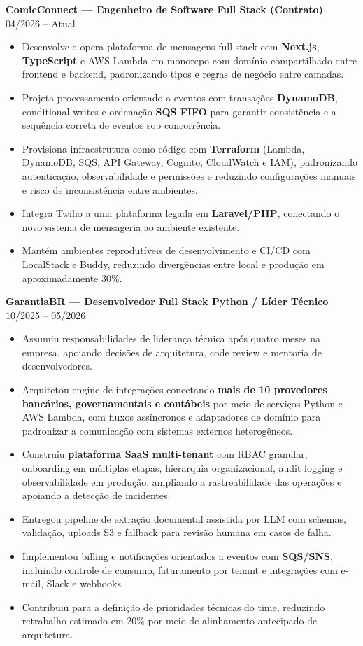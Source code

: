 \documentclass[a4paper,10pt]{article}
\begin{document}
\textbf{ComicConnect — Engenheiro de Software Full Stack (Contrato)} \hfill 04/2026 -- Atual
\begin{itemize}[leftmargin=*, itemsep=1pt]
    \item Desenvolve e opera plataforma de mensagens full stack com \textbf{Next.js}, \textbf{TypeScript} e AWS Lambda em monorepo com domínio compartilhado entre frontend e backend, padronizando tipos e regras de negócio entre camadas.
    \item Projeta processamento orientado a eventos com transações \textbf{DynamoDB}, conditional writes e ordenação \textbf{SQS FIFO} para garantir consistência e a sequência correta de eventos sob concorrência.
    \item Provisiona infraestrutura como código com \textbf{Terraform} (Lambda, DynamoDB, SQS, API Gateway, Cognito, CloudWatch e IAM), padronizando autenticação, observabilidade e permissões e reduzindo configurações manuais e risco de inconsistência entre ambientes.
    \item Integra Twilio a uma plataforma legada em \textbf{Laravel/PHP}, conectando o novo sistema de mensageria ao ambiente existente.
    \item Mantém ambientes reprodutíveis de desenvolvimento e CI/CD com LocalStack e Buddy, reduzindo divergências entre local e produção em aproximadamente 30\%.
\end{itemize}

\textbf{GarantiaBR — Desenvolvedor Full Stack Python / Líder Técnico} \hfill 10/2025 -- 05/2026
\begin{itemize}[leftmargin=*, itemsep=1pt]
    \item Assumiu responsabilidades de liderança técnica após quatro meses na empresa, apoiando decisões de arquitetura, code review e mentoria de desenvolvedores.
    \item Arquitetou engine de integrações conectando \textbf{mais de 10 provedores bancários, governamentais e contábeis} por meio de serviços Python e AWS Lambda, com fluxos assíncronos e adaptadores de domínio para padronizar a comunicação com sistemas externos heterogêneos.
    \item Construiu \textbf{plataforma SaaS multi-tenant} com RBAC granular, onboarding em múltiplas etapas, hierarquia organizacional, audit logging e observabilidade em produção, ampliando a rastreabilidade das operações e apoiando a detecção de incidentes.
    \item Entregou pipeline de extração documental assistida por LLM com schemas, validação, uploads S3 e fallback para revisão humana em casos de falha.
    \item Implementou billing e notificações orientados a eventos com \textbf{SQS/SNS}, incluindo controle de consumo, faturamento por tenant e integrações com e-mail, Slack e webhooks.
    \item Contribuiu para a definição de prioridades técnicas do time, reduzindo retrabalho estimado em 20\% por meio de alinhamento antecipado de arquitetura.
\end{itemize}
\end{document}
